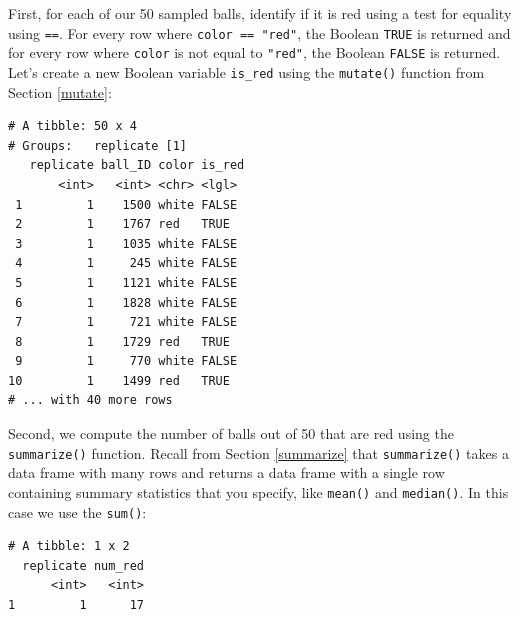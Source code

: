 \documentclass[12pt, krantz2,]{krantz}
\makeatletter
\newenvironment{Shaded}{\begin{snugshade}}{\end{snugshade}}
\newcommand{\DataTypeTok}[1]{\textcolor[rgb]{0.27,0.27,0.27}{#1}}
\newcommand{\KeywordTok}[1]{\textcolor[rgb]{0.27,0.27,0.27}{\textbf{#1}}}
\newcommand{\NormalTok}[1]{#1}
\newcommand{\OperatorTok}[1]{\textcolor[rgb]{0.43,0.43,0.43}{\textbf{#1}}}
\newcommand{\StringTok}[1]{\textcolor[rgb]{0.5,0.5,0.5}{#1}}
\newenvironment{kframe}{%
\medskip{}
\setlength{\fboxsep}{.8em}
 \def\at@end@of@kframe{}%
 \ifinner\ifhmode%
  \def\at@end@of@kframe{\end{minipage}}%
  \begin{minipage}{\columnwidth}%
 \fi\fi%
 \def\FrameCommand##1{\hskip\@totalleftmargin \hskip-\fboxsep
 \colorbox{shadecolor}{##1}\hskip-\fboxsep
     \hskip-\linewidth \hskip-\@totalleftmargin \hskip\columnwidth}%
 \MakeFramed {\advance\hsize-\width
   \@totalleftmargin\z@ \linewidth\hsize
   \@setminipage}}%
 {\par\unskip\endMakeFramed%
 \at@end@of@kframe}
\renewenvironment{Shaded}{\begin{kframe}}{\end{kframe}}
\makeatother
\begin{document}
First, for each of our 50 sampled balls, identify if it is red using a test for equality using \texttt{==}. For every row where \texttt{color\ ==\ "red"}, the Boolean \texttt{TRUE} is returned and for every row where \texttt{color} is not equal to \texttt{"red"}, the Boolean \texttt{FALSE} is returned. Let's create a new Boolean variable \texttt{is\_red} using the \texttt{mutate()} function from Section \ref{mutate}:

\begin{Shaded}
\end{Shaded}

\begin{verbatim}
# A tibble: 50 x 4
# Groups:   replicate [1]
   replicate ball_ID color is_red
       <int>   <int> <chr> <lgl> 
 1         1    1500 white FALSE 
 2         1    1767 red   TRUE  
 3         1    1035 white FALSE 
 4         1     245 white FALSE 
 5         1    1121 white FALSE 
 6         1    1828 white FALSE 
 7         1     721 white FALSE 
 8         1    1729 red   TRUE  
 9         1     770 white FALSE 
10         1    1499 red   TRUE  
# ... with 40 more rows
\end{verbatim}

Second, we compute the number of balls out of 50 that are red using the \texttt{summarize()} function. Recall from Section \ref{summarize} that \texttt{summarize()} takes a data frame with many rows and returns a data frame with a single row containing summary statistics that you specify, like \texttt{mean()} and \texttt{median()}. In this case we use the \texttt{sum()}:

\begin{Shaded}
\end{Shaded}

\begin{verbatim}
# A tibble: 1 x 2
  replicate num_red
      <int>   <int>
1         1      17
\end{verbatim}
\end{document}
